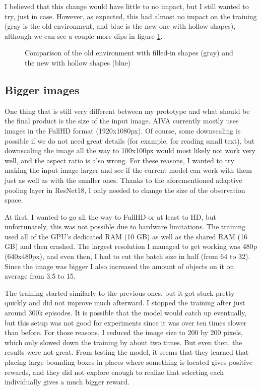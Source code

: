 \documentclass[
  digital,     %
  oneside,     %
  nosansbold,  %
  nocolorbold, %
  lof,         %
  lot,         %
]{fithesis4}
\begin{document}
I believed that this change would have little to no impact, but I still wanted to try, just in case. However, as expected, this had almost no impact on the training (gray is the old environment, and blue is the new one with hollow shapes), although we can see a couple more dips in figure \ref{fig:v5}.

\begin{figure}
    \centering
    \makebox[\textwidth][c]{}
    \caption{Comparison of the old environment with filled-in shapes (gray) and the new with hollow shapes (blue)}
    \label{fig:v5}
\end{figure}

\subsection{Bigger images}
One thing that is still very different between my prototype and what should be the final product is the size of the input image. AIVA currently mostly uses images in the FullHD format (1920x1080px). Of course, some downscaling is possible if we do not need great details (for example, for reading small text), but downscaling the image all the way to 100x100px would most likely not work very well, and the aspect ratio is also wrong. For these reasons, I wanted to try making the input image larger and see if the current model can work with them just as well as with the smaller ones. Thanks to the aforementioned adaptive pooling layer in ResNet18, I only needed to change the size of the observation space.

At first, I wanted to go all the way to FullHD or at least to HD, but unfortunately, this was not possible due to hardware limitations. The training used all of the GPU's dedicated RAM (10 GB) as well as the shared RAM (16 GB) and then crashed. The largest resolution I managed to get working was 480p (640x480px), and even then, I had to cut the batch size in half (from 64 to 32). Since the image was bigger I also increased the amount of objects on it on average from 3.5 to 15.

The training started similarly to the previous ones, but it got stuck pretty quickly and did not improve much afterward. I stopped the training after just around 300k episodes. It is possible that the model would catch up eventually, but this setup was not good for experiments since it was over ten times slower than before. For those reasons, I reduced the image size to 200 by 200 pixels, which only slowed down the training by about two times. But even then, the results were not great. From testing the model, it seems that they learned that placing large bounding boxes in places where something is located gives positive rewards, and they did not explore enough to realize that selecting each individually gives a much bigger reward. 
\end{document}
